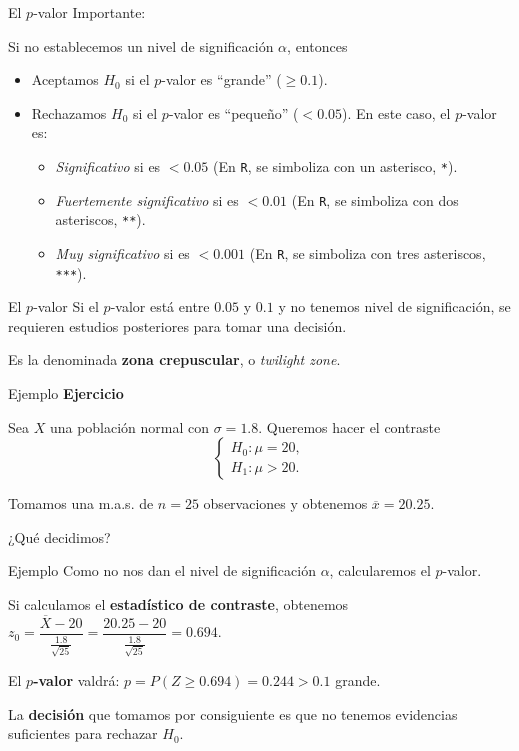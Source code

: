 \documentclass[
  ignorenonframetext,
]{beamer}
\providecommand{\tightlist}{%
  \setlength{\itemsep}{0pt}\setlength{\parskip}{0pt}}
\begin{document}
\begin{frame}[fragile]{El \(p\)-valor}
\protect\hypertarget{el-p-valor-13}{}
Importante:

Si no establecemos un nivel de significación \(\alpha\), entonces

\begin{itemize}[<+->]
\item
  Aceptamos \(H_0\) si el \(p\)-valor es ``grande'' (\(\geq 0.1\)).
\item
  Rechazamos \(H_0\) si el \(p\)-valor es ``pequeño'' (\(<0.05\)). En
  este caso, el \(p\)-valor es:

  \begin{itemize}[<+->]
  \tightlist
  \item
    \emph{Significativo} si es \(< 0.05\) (En \texttt{R}, se simboliza
    con un asterisco, \texttt{*}).
  \item
    \emph{Fuertemente significativo} si es \(<0.01\) (En \texttt{R}, se
    simboliza con dos asteriscos, \texttt{**}).
  \item
    \emph{Muy significativo} si es \(<0.001\) (En \texttt{R}, se
    simboliza con tres asteriscos, \texttt{***}).
  \end{itemize}
\end{itemize}
\end{frame}

\begin{frame}{El \(p\)-valor}
\protect\hypertarget{el-p-valor-14}{}
Si el \(p\)-valor está entre \(0.05\) y \(0.1\) y no tenemos nivel de
significación, se requieren estudios posteriores para tomar una
decisión.

Es la denominada \textbf{zona crepuscular}, o \emph{twilight zone}.
\end{frame}

\begin{frame}{Ejemplo}
\protect\hypertarget{ejemplo}{}
\textbf{Ejercicio}

Sea \(X\) una población normal con \(\sigma=1.8\). Queremos hacer el
contraste \[
\left\{\begin{array}{l}
H_0:\mu=20,\\ H_1:\mu>20.
\end{array}
\right.
\]

Tomamos una m.a.s. de \(n=25\) observaciones y obtenemos
\(\overline{x}=20.25\).

¿Qué decidimos?
\end{frame}

\begin{frame}{Ejemplo}
\protect\hypertarget{ejemplo-1}{}
Como no nos dan el nivel de significación \(\alpha\), calcularemos el
\(p\)-valor.

Si calculamos el \textbf{estadístico de contraste}, obtenemos
\(z_0= \dfrac{\overline{X}-20}{\frac{1.8}{\sqrt{25}}}=\dfrac{20.25-20}{\frac{1.8}{\sqrt{25}}}=0.694.\)

El \textbf{\(p\)-valor} valdrá: \(p =P(Z\geq 0.694)= 0.244 > 0.1\)
grande.

La \textbf{decisión} que tomamos por consiguiente es que no tenemos
evidencias suficientes para rechazar \(H_0\).
\end{frame}
\end{document}
